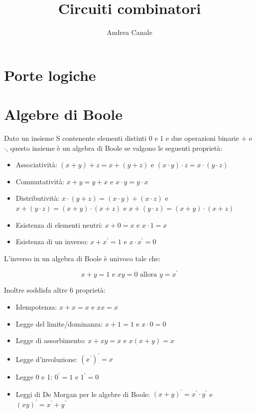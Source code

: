 \documentclass[a4paper]{article}
\title{Circuiti combinatori}
\author{Andrea Canale}
\begin{document}
	\maketitle
	\tableofcontents

\section{Porte logiche}

\section{Algebre di Boole}

Dato un insieme S contenente elementi distinti 0 e 1 e due operazioni binarie $+$ e $\cdot $, questo insieme è un algebra di Boole se valgono le seguenti proprietà:

\begin{itemize}
	\item Associatività: $(x+y)+z=x+(y+z)$ e $(x \cdot y) \cdot z=x \cdot (y \cdot z)$
	\item Commutatività: $x+y=y+x$ e $x \cdot y = y \cdot x$
	\item Distributività: $x \cdot (y+z) = (x \cdot y) + (x \cdot z)$ e $ x + (y \cdot z) = (x+y) \cdot (x+z)$ e $x + (y \cdot z) = (x + y) \cdot (x + z)$
	\item Esistenza di elementi neutri: $x+0=x$ e $x \cdot 1 = x$
	\item Esistenza di un inverso: $x+x^{'} = 1$ e $x \cdot x^{'} = 0$
\end{itemize}

L'inverso in un algebra di Boole è univoco tale che:

$$ x+y = 1 \text{ e } xy=0 \text{ allora } y=x^{'}$$

Inoltre soddisfa altre 6 proprietà:

\begin{itemize}
	\item Idempotenza: $x+x=x$ e $xx=x$
	\item Legge del limite/dominanza: $x+1=1$ e $x \cdot 0 = 0$
	\item Legge di assorbimento: $x+xy=x$ e $x(x+y) = x$
	\item Legge d'involuzione: $(x^{'})^{'} = x$
	\item Legge 0 e 1: $0^{'} = 1$ e $1^{'} = 0$
	\item Leggi di De Morgan per le algebre di Boole: $(x+y)^{'} = x^{'} \cdot y^{'}$ e $(xy)^{'} = x^{'} + y^{'}$
\end{itemize}
\end{document}

